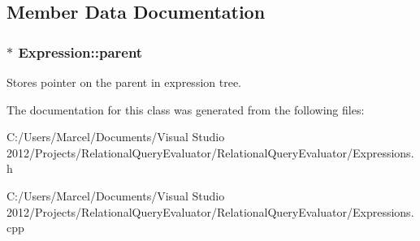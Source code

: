 \subsection{Member Data Documentation}
\hypertarget{class_expression_a36284ba467eae6aa796985ed909a6958}{
\subsubsection[{parent}]{$\ast$ Expression\+::parent}}\label{class_expression_a36284ba467eae6aa796985ed909a6958}
Stores pointer on the parent in expression tree. 

The documentation for this class was generated from the following files\+:\begin{DoxyCompactItemize}
\item 
C\+:/\+Users/\+Marcel/\+Documents/\+Visual Studio 2012/\+Projects/\+Relational\+Query\+Evaluator/\+Relational\+Query\+Evaluator/Expressions.\+h\item 
C\+:/\+Users/\+Marcel/\+Documents/\+Visual Studio 2012/\+Projects/\+Relational\+Query\+Evaluator/\+Relational\+Query\+Evaluator/Expressions.\+cpp\end{DoxyCompactItemize}

